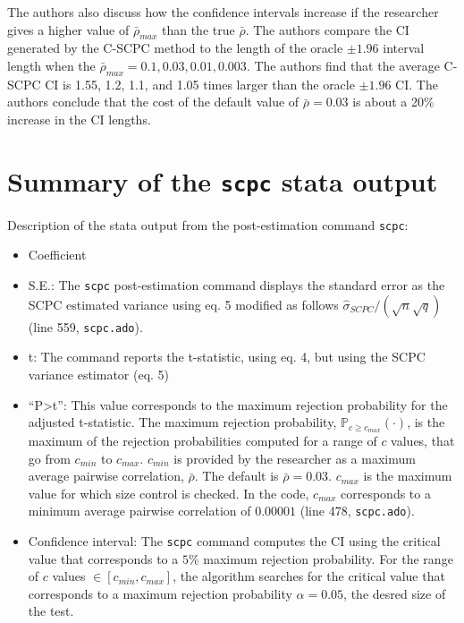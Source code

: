 \documentclass[
]{article}
\providecommand{\tightlist}{%
  \setlength{\itemsep}{0pt}\setlength{\parskip}{0pt}}\usepackage{longtable,booktabs,array}
\begin{document}
The authors also discuss how the confidence intervals increase if the
researcher gives a higher value of \(\bar\rho_{max}\) than the true
\(\bar\rho\). The authors compare the CI generated by the C-SCPC method
to the length of the oracle \(\pm 1.96\) interval length when the
\(\bar\rho_{max}={0.1, 0.03,0.01,0.003}\). The authors find that the
average C-SCPC CI is 1.55, 1.2, 1.1, and 1.05 times larger than the
oracle \(\pm 1.96\) CI. The authors conclude that the cost of the
default value of \(\bar\rho=0.03\) is about a 20\% increase in the CI
lengths.

\hypertarget{summary-of-the-scpc-stata-output}{%
\section{\texorpdfstring{Summary of the \texttt{scpc} stata
output}{Summary of the scpc stata output}}\label{summary-of-the-scpc-stata-output}}

Description of the stata output from the post-estimation command
\texttt{scpc}:

\begin{itemize}
\tightlist
\item
  Coefficient
\item
  S.E.: The \texttt{scpc} post-estimation command displays the standard
  error as the SCPC estimated variance using eq. 5 modified as follows
  \(\hat\sigma_{SCPC}/(\sqrt{n}\sqrt{q})\) (line 559,
  \texttt{scpc.ado}).
\item
  t: The command reports the t-statistic, using eq. 4, but using the
  SCPC variance estimator (eq. 5)
\item
  ``P\textgreater\textbar t\textbar{}'': This value corresponds to the
  maximum rejection probability for the adjusted t-statistic. The
  maximum rejection probability, \(\mathbb{P}_{c\ge c_{max}}(\cdot)\),
  is the maximum of the rejection probabilities computed for a range of
  \(c\) values, that go from \(c_{min}\) to \(c_{max}\). \(c_{min}\) is
  provided by the researcher as a maximum average pairwise correlation,
  \(\bar\rho\). The default is \(\bar\rho=0.03\). \(c_{max}\) is the
  maximum value for which size control is checked. In the code,
  \(c_{max}\) corresponds to a minimum average pairwise correlation of
  \(0.00001\) (line 478, \texttt{scpc.ado}).
\item
  Confidence interval: The \texttt{scpc} command computes the CI using
  the critical value that corresponds to a \(5\%\) maximum rejection
  probability. For the range of \(c\) values \(\in[c_{min},c_{max}]\),
  the algorithm searches for the critical value that corresponds to a
  maximum rejection probability \(\alpha=0.05\), the desred size of the
  test.
\end{itemize}
\end{document}
